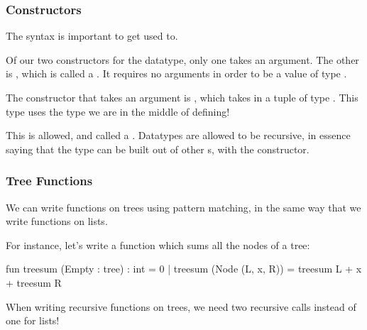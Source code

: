 \documentclass[aspectratio=169]{beamer}
\begin{document}
\begin{frame}[fragile]
  \frametitle{Constructors}

  \rprs

  The syntax is important to get used to.

  \pause
  \vspace{\fill}

  Of our two constructors for the  datatype, only one takes an argument. The other is
  , which is called a . It requires no arguments in order
  to be a value of type .

  \pause
  \vspace{\fill}

  The constructor that takes an argument is , which takes in a tuple of type
  . This type uses the  type we are in the middle of defining!

  \pause
  \vspace{\fill}

  This is allowed, and called a . Datatypes are allowed to be recursive,
  in essence saying that the  type can be built out of other s, with the
   constructor.
\end{frame}

\begin{frame}[fragile]
  \frametitle{Tree Functions}

  We can write functions on trees using pattern matching, in the same way that we
  write functions on lists.

  \pause
  \vspace{\fill}

  For instance, let's write a function which sums all the nodes of a tree:

  \begin{codeblock}
    fun treesum (Empty : tree) : int = 0
      | treesum (Node (L, x, R)) = treesum L + x + treesum R
  \end{codeblock}

  \pause
  \vspace{\fill}

  When writing recursive functions on trees, we need two recursive calls instead of one
  for lists!
\end{frame}
\end{document}
